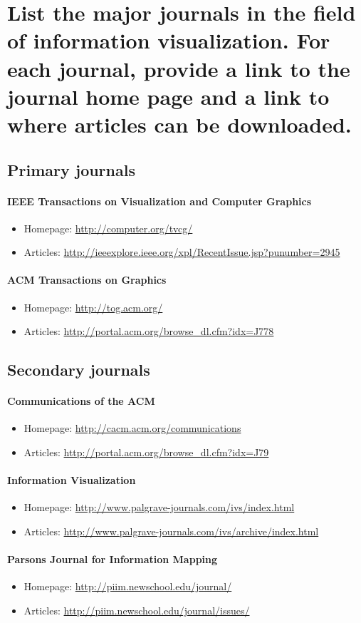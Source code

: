 \section{List the major journals in the field of information visualization. For each
journal, provide a link to the journal home page and a link to where articles can be
downloaded.}

\subsection{Primary journals}
\paragraph{IEEE Transactions on Visualization and Computer Graphics}
\begin{itemize}
	\item Homepage: \url{http://computer.org/tvcg/}
	\item Articles: \url{http://ieeexplore.ieee.org/xpl/RecentIssue.jsp?punumber=2945}
\end{itemize}

\paragraph{ACM Transactions on Graphics}
\begin{itemize}
	\item Homepage: \url{http://tog.acm.org/}
	\item Articles: \url{http://portal.acm.org/browse_dl.cfm?idx=J778}
\end{itemize}

\subsection{Secondary journals}
\paragraph{Communications of the ACM}
\begin{itemize}
  \item Homepage: \url{http://cacm.acm.org/communications}
  \item Articles: \url{http://portal.acm.org/browse_dl.cfm?idx=J79}
\end{itemize}

\paragraph{Information Visualization}
\begin{itemize}
	\item Homepage: \url{http://www.palgrave-journals.com/ivs/index.html}
	\item Articles: \url{http://www.palgrave-journals.com/ivs/archive/index.html}
\end{itemize}

\paragraph{Parsons Journal for Information Mapping}
\begin{itemize}
	\item Homepage: \url{http://piim.newschool.edu/journal/}
	\item Articles: \url{http://piim.newschool.edu/journal/issues/}
\end{itemize}